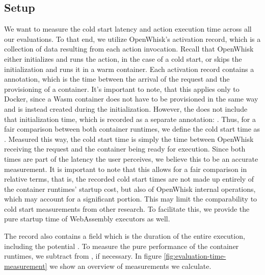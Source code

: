 
\subsection{Setup}

We want to measure the cold start latency and action execution time across all our evaluations. To that end, we utilize OpenWhisk's activation record, which is a collection of data resulting from each action invocation.  Recall that OpenWhisk either initializes and runs the action, in the case of a cold start, or skips the initialization and runs it in a warm container. Each activation record contains a  annotation, which is the time between the arrival of the request and the provisioning of a container. It's important to note, that this applies only to Docker, since a Wasm container does not have to be provisioned in the same way and is instead created during the initialization. However, the  does not include that initialization time, which is recorded as a separate annotation: . Thus, for a fair comparison between both container runtimes, we define the cold start time as . Measured this way, the cold start time is simply the time between OpenWhisk receiving the request and the container being ready for execution. Since both times are part of the latency the user perceives, we believe this to be an accurate measurement. It is important to note that this allows for a fair comparison in relative terms, that is, the recorded cold start times are not made up entirely of the container runtimes' startup cost, but also of OpenWhisk internal operations, which may account for a significant portion. This may limit the comparability to cold start measurements from other research.
To facilitate this, we provide the pure startup time of WebAssembly executors as well.

The record also contains a  field which is the duration of the entire execution, including the potential . To measure the pure performance of the container runtimes, we subtract  from , if necessary. In figure \ref{fig:evaluation-time-measurement} we show an overview of measurements we calculate.

